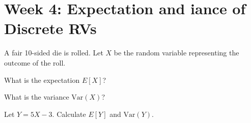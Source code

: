 \documentclass[a4paper, 10pt]{article}
\begin{document}
\subject[2110205 - Statistics for Computer Engineering]


\section{Week 4: Expectation and iance of Discrete RVs}



\begin{problem}
A fair 10-sided die is rolled. Let \( X \) be the random variable representing the outcome of the roll.
\begin{subproblems}
    \item What is the expectation \( E[X] \)?
    \item What is the variance \( \text{Var}(X) \)?
    \item Let \( Y = 5X - 3 \). Calculate \( E[Y] \) and \( \text{Var}(Y) \).
\end{subproblems}
\end{problem}
\end{document}
